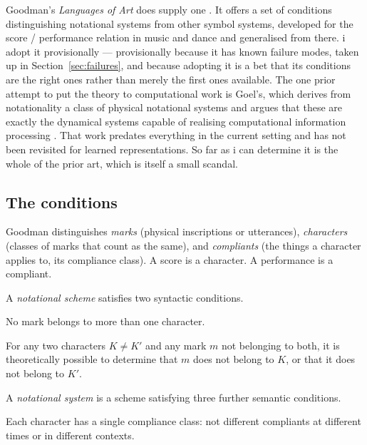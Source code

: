 Goodman's \emph{Languages of Art} does supply one
\cite{goodman1968}.
It offers a set of conditions distinguishing notational systems
from other symbol systems, developed for the score / performance
relation in music and dance and generalised from there.
i adopt it provisionally --- provisionally because it has known
failure modes, taken up in Section~\ref{sec:failures}, and because
adopting it is a bet that its conditions are the right ones rather
than merely the first ones available.
The one prior attempt to put the theory to computational work is
Goel's, which derives from notationality a class of physical
notational systems and argues that these are exactly the dynamical
systems capable of realising computational information processing
\cite{goel1991}.
That work predates everything in the current setting and has not
been revisited for learned representations.
So far as i can determine it is the whole of the prior art, which
is itself a small scandal.

\subsection{The conditions}
\label{sec:conditions}

Goodman distinguishes \emph{marks} (physical inscriptions or
utterances), \emph{characters} (classes of marks that count as the
same), and \emph{compliants} (the things a character applies to,
its compliance class).
A score is a character.
A performance is a compliant.

A \emph{notational scheme} satisfies two syntactic conditions.

\begin{condition}
\label{cond:sd}
No mark belongs to more than one character.
\end{condition}

\begin{condition}
\label{cond:sfd}
For any two characters $K \neq K'$ and any mark $m$ not belonging
to both, it is theoretically possible to determine that $m$ does
not belong to $K$, or that it does not belong to $K'$.
\end{condition}

\noindent
A \emph{notational system} is a scheme satisfying three further
semantic conditions.

\begin{condition}[Unambiguity]
\label{cond:ua}
Each character has a single compliance class: not different
compliants at different times or in different contexts.
\end{condition}

